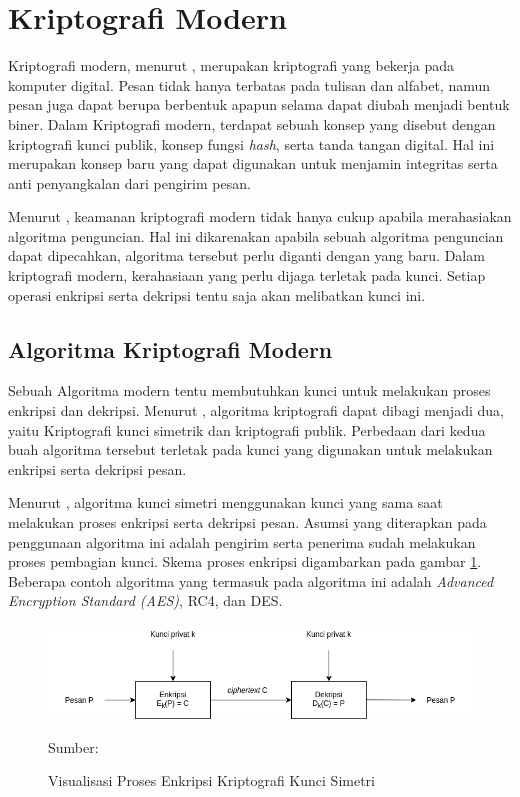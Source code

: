 \section{Kriptografi Modern}
Kriptografi modern, menurut \textcite{munir2019}, merupakan kriptografi yang bekerja pada komputer digital. Pesan tidak hanya terbatas pada tulisan dan alfabet, namun pesan juga dapat berupa berbentuk apapun selama dapat diubah menjadi bentuk biner. Dalam Kriptografi modern, terdapat sebuah konsep yang disebut dengan kriptografi kunci publik, konsep fungsi \emph{hash}, serta tanda tangan digital. Hal ini merupakan konsep baru yang dapat digunakan untuk menjamin integritas serta anti penyangkalan dari pengirim pesan.

Menurut \textcite{schneier1996}, keamanan kriptografi modern tidak hanya cukup apabila merahasiakan algoritma penguncian. Hal ini dikarenakan apabila sebuah algoritma penguncian dapat dipecahkan, algoritma tersebut perlu diganti dengan yang baru. Dalam kriptografi modern, kerahasiaan yang perlu dijaga terletak pada kunci. Setiap operasi enkripsi serta dekripsi tentu saja akan melibatkan kunci ini. 

\subsection{Algoritma Kriptografi Modern}

Sebuah Algoritma modern tentu membutuhkan kunci untuk melakukan proses enkripsi dan dekripsi. Menurut \textcite{schneier1996}, algoritma kriptografi dapat dibagi menjadi dua, yaitu Kriptografi kunci simetrik dan kriptografi publik. Perbedaan dari kedua buah algoritma tersebut terletak pada kunci yang digunakan untuk melakukan enkripsi serta dekripsi pesan. 

Menurut \textcite{munir2019}, algoritma kunci simetri menggunakan kunci yang sama saat melakukan proses enkripsi serta dekripsi pesan. Asumsi yang diterapkan pada penggunaan algoritma ini adalah pengirim serta penerima sudah melakukan proses pembagian kunci. Skema proses enkripsi digambarkan pada gambar \ref{fig:crypto.symetric}. Beberapa contoh algoritma yang termasuk pada algoritma ini adalah \emph{Advanced Encryption Standard (AES)}, RC4, dan DES.

\begin{figure}[!h]
  \centering
  \includegraphics[width=\textwidth]{chapters/res/chapter-2/img/crypto.symetric.png}
  \caption{Visualisasi Proses Enkripsi Kriptografi Kunci Simetri} \label{fig:crypto.symetric}
  Sumber: \textcite{munir2019}
\end{figure}

